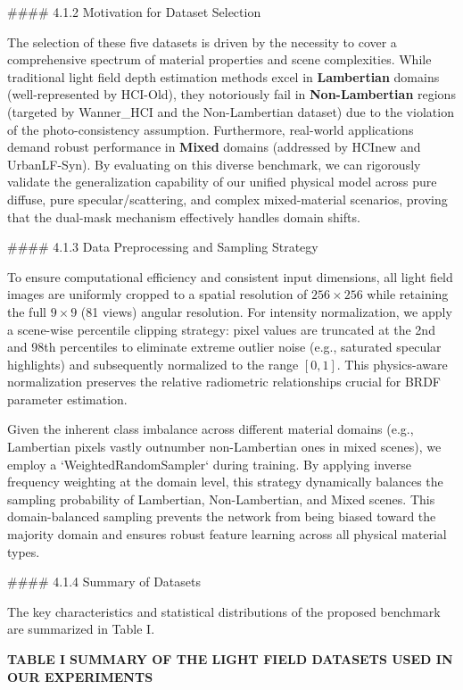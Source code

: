 \documentclass[journal]{IEEEtran}
\begin{document}
\#\#\#\# 4.1.2 Motivation for Dataset Selection

The selection of these five datasets is driven by the necessity to cover a comprehensive spectrum of material properties and scene complexities. While traditional light field depth estimation methods excel in \textbf{Lambertian} domains (well-represented by HCI-Old), they notoriously fail in \textbf{Non-Lambertian} regions (targeted by Wanner_HCI and the Non-Lambertian dataset) due to the violation of the photo-consistency assumption. Furthermore, real-world applications demand robust performance in \textbf{Mixed} domains (addressed by HCInew and UrbanLF-Syn). By evaluating on this diverse benchmark, we can rigorously validate the generalization capability of our unified physical model across pure diffuse, pure specular/scattering, and complex mixed-material scenarios, proving that the dual-mask mechanism effectively handles domain shifts.

\#\#\#\# 4.1.3 Data Preprocessing and Sampling Strategy

To ensure computational efficiency and consistent input dimensions, all light field images are uniformly cropped to a spatial resolution of \(256 \times 256\) while retaining the full \(9 \times 9\) (81 views) angular resolution. For intensity normalization, we apply a scene-wise percentile clipping strategy: pixel values are truncated at the 2nd and 98th percentiles to eliminate extreme outlier noise (e.g., saturated specular highlights) and subsequently normalized to the range \([0, 1]\). This physics-aware normalization preserves the relative radiometric relationships crucial for BRDF parameter estimation.

Given the inherent class imbalance across different material domains (e.g., Lambertian pixels vastly outnumber non-Lambertian ones in mixed scenes), we employ a `WeightedRandomSampler` during training. By applying inverse frequency weighting at the domain level, this strategy dynamically balances the sampling probability of Lambertian, Non-Lambertian, and Mixed scenes. This domain-balanced sampling prevents the network from being biased toward the majority domain and ensures robust feature learning across all physical material types.

\#\#\#\# 4.1.4 Summary of Datasets

The key characteristics and statistical distributions of the proposed benchmark are summarized in Table I.

\textbf{TABLE I}
\textbf{SUMMARY OF THE LIGHT FIELD DATASETS USED IN OUR EXPERIMENTS}
\end{document}
